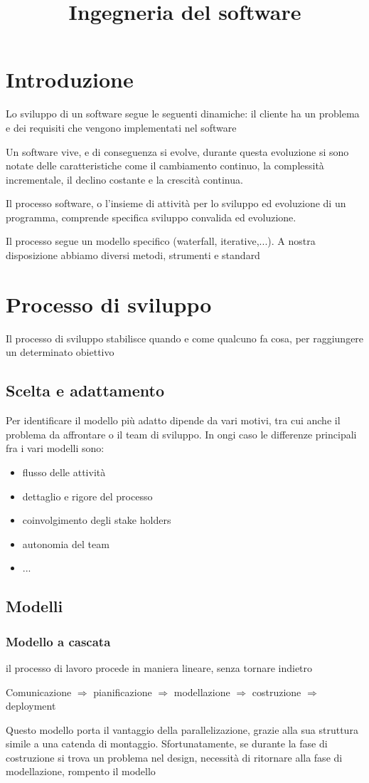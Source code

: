 \documentclass[12pt, a4paper]{article}
\title{Ingegneria del software}
\begin{document}
\section{Introduzione}
Lo sviluppo di un software segue le seguenti dinamiche: il cliente ha  un problema e dei requisiti che 
vengono implementati nel software

Un software vive, e di conseguenza si evolve, durante questa evoluzione si sono notate delle 
caratteristiche come il cambiamento continuo, la complessità incrementale, il declino costante e la 
crescità continua. 

Il processo software, o l'insieme di attività per lo sviluppo ed evoluzione di un programma, comprende 
specifica sviluppo convalida ed evoluzione. 

Il processo segue un modello specifico (waterfall, iterative,...). A nostra disposizione abbiamo diversi 
metodi, strumenti e standard

\newpage
\section{Processo di sviluppo}
Il processo di sviluppo stabilisce quando e come qualcuno fa cosa, per raggiungere un determinato obiettivo

\subsection{Scelta e adattamento}
Per identificare il modello più adatto dipende da vari motivi, tra cui anche il problema da affrontare o il team di 
sviluppo. In ongi caso le differenze principali fra i vari modelli sono: 
\begin{itemize}
    \item flusso delle attività
    \item dettaglio e rigore del processo
    \item coinvolgimento degli stake holders
    \item autonomia del team
    \item ...
\end{itemize}

\subsection{Modelli}
\subsubsection{Modello a cascata}
il processo di lavoro procede in maniera lineare, senza tornare indietro 
\begin{center}
    Comunicazione $\Rightarrow$ pianificazione $\Rightarrow$ modellazione $\Rightarrow$ costruzione 
    $\Rightarrow$ deployment
\end{center}
Questo modello porta il vantaggio della parallelizazione, grazie alla sua struttura simile a una catenda di montaggio.
Sfortunatamente, se durante la fase di costruzione si trova un problema nel design, necessità di ritornare alla 
fase di modellazione, rompento il modello
\end{document}

